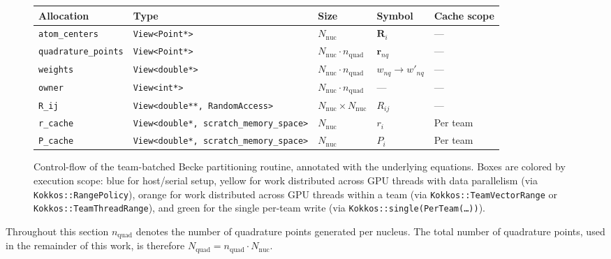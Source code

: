 \documentclass{article}
\begin{document}
\begin{figure}[H]
  \vspace{6mm}

  {\small
    \begin{tabular}{@{}l l l l l@{}}
      \toprule
      Allocation & Type & Size & Symbol & Cache scope \\
      \midrule
      \texttt{atom\_centers}      &
      \texttt{View<Point*>}
      & $N_\text{nuc}$ &  $\mathbf{R}_i$            & --- \\
      \texttt{quadrature\_points} &
      \texttt{View<Point*>}
      & $N_\text{nuc}\cdot n_\text{quad}$ & $\mathbf{r}_{nq}$         & --- \\
      \texttt{weights}            &
      \texttt{View<double*>}
      & $N_\text{nuc}\cdot n_\text{quad}$   & $w_{nq} \to w'_{nq}$
      & --- \\
      \texttt{owner}            &
      \texttt{View<int*>}
      & $N_\text{nuc}\cdot n_\text{quad}$    & ---       & --- \\
      \texttt{R\_ij}              &
      \texttt{View<double**, RandomAccess>}
      & $N_\text{nuc}\times N_\text{nuc}$  & $R_{ij}$                  & --- \\
      \texttt{r\_cache}           &
      \texttt{View<double*,
      scratch\_memory\_space>} & $N_\text{nuc}$ & $r_i$
      & Per team \\
      \texttt{P\_cache}           &
      \texttt{View<double*,
      scratch\_memory\_space>} & $N_\text{nuc}$ & $P_i$
      & Per team \\
      \bottomrule
    \end{tabular}
  \label{tab:becke_team_memory_allocations}}

  \caption{Control-flow of the team-batched Becke partitioning
    routine, annotated
    with the underlying equations. Boxes are colored by
    execution scope: blue for
    host/serial setup, yellow for work distributed across
    GPU threads with data
    parallelism (via \texttt{Kokkos::RangePolicy}),
    orange for work distributed
    across GPU threads within a team (via
      \texttt{Kokkos::TeamVectorRange} or
    \texttt{Kokkos::TeamThreadRange}), and green for the
    single per-team write
  (via \texttt{Kokkos::single(PerTeam(\ldots))}).}
  \label{fig:becke_team_flow}
\end{figure}

Throughout this section \( n_\text{quad} \) denotes the number of
quadrature points generated per nucleus. The total number of quadrature
points, used in the remainder of this work, is therefore
\( N_\text{quad} = n_\text{quad} \cdot N_\text{nuc} \).
\end{document}
